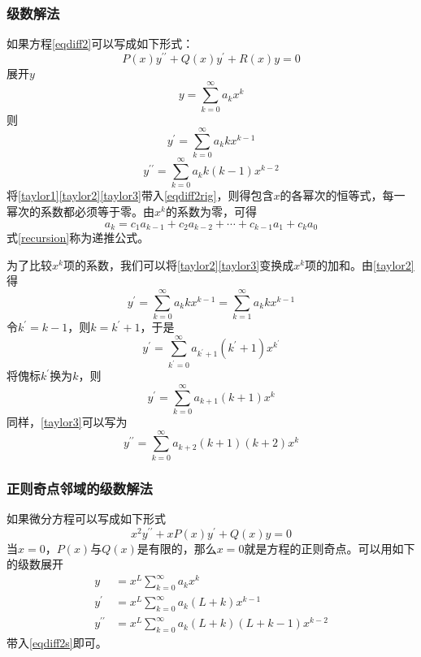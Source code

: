 \documentclass[]{article}
\begin{document}
\subsubsection{级数解法}
如果方程\eqref{eqdiff2}可以写成如下形式：
\begin{equation}
	P(x)y^{\prime\prime}+Q(x)y^{\prime}+R(x)y=0
	\label{eqdiff2rig}
\end{equation}
展开$y$
\begin{equation}
	y=\sum\limits_{k=0}^{\infty}a_kx^k
	\label{taylor1}
\end{equation}
则
\begin{equation}
	y^{\prime}=\sum\limits_{k=0}^{\infty}a_k kx^{k-1}
	\label{taylor2}
\end{equation}
\begin{equation}
	y^{\prime\prime}=\sum\limits_{k=0}^{\infty}a_k k(k-1)x^{k-2}
	\label{taylor3}
\end{equation}
将\eqref{taylor1}\eqref{taylor2}\eqref{taylor3}带入\eqref{eqdiff2rig}，则得包含$x$的各幂次的恒等式，每一幂次的系数都必须等于零。由$x^k$的系数为零，可得
\begin{equation}
	a_k=c_1a_{k-1}+c_2a_{k-2}+\cdots+c_{k-1}a_{1}+c_ka_0
	\label{recursion}
\end{equation}
式\eqref{recursion}称为递推公式。\par 
为了比较$x^k$项的系数，我们可以将\eqref{taylor2}\eqref{taylor3}变换成$x^k$项的加和。由\eqref{taylor2}得
\begin{equation}
	y^{\prime}=\sum\limits_{k=0}^{\infty}a_k kx^{k-1}=\sum\limits_{k=1}^{\infty}a_k kx^{k-1}
\end{equation}
令$k^\prime=k-1$，则$k=k^\prime+1$，于是
\begin{equation}
	y^{\prime}=\sum\limits_{k^\prime=0}^{\infty}a_{k^\prime+1} (k^\prime+1)x^{k^\prime}
\end{equation}
将傀标$k^\prime$换为$k$，则
\begin{equation}
	y^{\prime}=\sum\limits_{k=0}^{\infty}a_{k+1} (k+1)x^{k}
\end{equation}
同样，\eqref{taylor3}可以写为
\begin{equation}
	y^{\prime\prime}=\sum\limits_{k=0}^{\infty}a_{k+2} (k+1)(k+2)x^{k}
\end{equation}
\subsubsection{正则奇点邻域的级数解法}
如果微分方程可以写成如下形式
\begin{equation}
	x^2y^{\prime\prime}+xP(x)y^{\prime}+Q(x)y=0
	\label{eqdiff2s}
\end{equation}
当$x=0$，$P(x)$与$Q(x)$是有限的，那么$x=0$就是方程的正则奇点。可以用如下的级数展开
\begin{align}
	y&=x^L\sum\limits_{k=0}^{\infty}a_kx^k\nonumber\\
	y^{\prime}&=x^L\sum\limits_{k=0}^{\infty}a_k (L+k)x^{k-1}\nonumber\\
	y^{\prime\prime}&=x^L\sum\limits_{k=0}^{\infty}a_k (L+k)(L+k-1)x^{k-2}
\end{align}
带入\eqref{eqdiff2s}即可。
\end{document}
